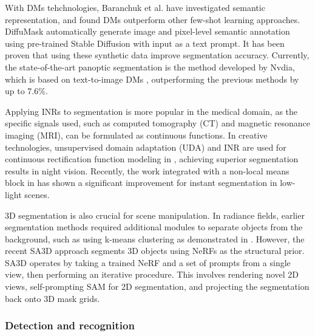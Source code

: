 \documentclass[11pt,a4paper]{article}
\begin{document}
With DMs tehchnologies, Baranchuk et al. \cite{Baranchuk:label:2022} have investigated semantic representation, and found DMs outperform other few-shot learning approaches. DiffuMask \cite{Wu:DiffuMask:2023} automatically generate image and pixel-level semantic annotation using pre-trained Stable Diffusion with input as a text prompt. It has been proven that using these synthetic data improve segmentation accuracy. Currently, the state-of-the-art panoptic segmentation is the method developed by Nvdia, which is based on text-to-image DMs \cite{Xu:Open:2023}, outperforming the previous methods by up to 7.6\%.

Applying INRs to segmentation is more popular in the medical domain, as the specific signals used, such as computed tomography (CT) and magnetic resonance imaging (MRI), can be formulated as continuous functions. In creative technologies, unsupervised domain adaptation (UDA) and INR are used for continuous rectification function modeling in \cite{Gong:Continuous:2023}, achieving superior segmentation results in night vision. Recently, the work integrated with a non-local means block in \cite{Lin:Feature:2024} has shown a significant improvement for instant segmentation in low-light scenes.

3D segmentation is also crucial for scene manipulation. In radiance fields, earlier segmentation methods required additional modules to separate objects from the background, such as using k-means clustering as demonstrated in \cite{Goel:Interactive:2023}. However, the recent SA3D approach \cite{Cen:Segment:2023} segments 3D objects using NeRFs as the structural prior. SA3D operates by taking a trained NeRF and a set of prompts from a single view, then performing an iterative procedure. This involves rendering novel 2D views, self-prompting SAM for 2D segmentation, and projecting the segmentation back onto 3D mask grids.

\subsubsection{Detection and recognition}
\label{sssec:recog}
\end{document}
